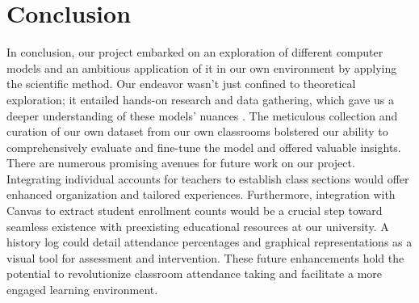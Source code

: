 \section{Conclusion}
\label{sec:conclusion}
In conclusion, our project embarked on an exploration of different computer models and an ambitious application of it in our own environment by applying the scientific method. Our endeavor wasn't just confined to theoretical exploration; it entailed hands-on research and data gathering, which gave us a deeper understanding of these models' nuances \cite{YOLO5}. The meticulous collection and curation of our own dataset from our own classrooms bolstered our ability to comprehensively evaluate and fine-tune the model and offered valuable insights. \cite{YOLO6}\\
There are numerous promising avenues for future work on our project. Integrating individual accounts for teachers to establish class sections would offer enhanced organization and tailored experiences. Furthermore, integration with Canvas to extract student enrollment counts would be a crucial step toward seamless existence with preexisting educational resources at our university. A history log could detail attendance percentages and graphical representations as a visual tool for assessment and intervention. These future enhancements hold the potential to revolutionize classroom attendance taking and facilitate a more engaged learning environment.
